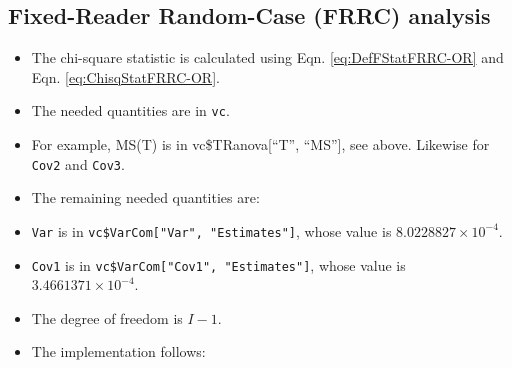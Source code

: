 \documentclass[
]{book}
\newenvironment{Shaded}{\begin{snugshade}}{\end{snugshade}}
\newcommand{\CommentTok}[1]{\textcolor[rgb]{0.56,0.35,0.01}{\textit{#1}}}
\newcommand{\DataTypeTok}[1]{\textcolor[rgb]{0.13,0.29,0.53}{#1}}
\newcommand{\DecValTok}[1]{\textcolor[rgb]{0.00,0.00,0.81}{#1}}
\newcommand{\KeywordTok}[1]{\textcolor[rgb]{0.13,0.29,0.53}{\textbf{#1}}}
\newcommand{\NormalTok}[1]{#1}
\newcommand{\OperatorTok}[1]{\textcolor[rgb]{0.81,0.36,0.00}{\textbf{#1}}}
\newcommand{\OtherTok}[1]{\textcolor[rgb]{0.56,0.35,0.01}{#1}}
\newcommand{\StringTok}[1]{\textcolor[rgb]{0.31,0.60,0.02}{#1}}
\providecommand{\tightlist}{%
  \setlength{\itemsep}{0pt}\setlength{\parskip}{0pt}}
\begin{document}
\begin{Shaded}
\end{Shaded}

\hypertarget{or-applications-FRRC-dataset02-hand}{%
\subsection{Fixed-Reader Random-Case (FRRC) analysis}\label{or-applications-FRRC-dataset02-hand}}

\begin{itemize}
\tightlist
\item
  The chi-square statistic is calculated using Eqn. \eqref{eq:DefFStatFRRC-OR} and Eqn. \eqref{eq:ChisqStatFRRC-OR}.
\item
  The needed quantities are in \texttt{vc}.
\item
  For example, MS(T) is in vc\$TRanova{[}``T'', ``MS''{]}, see above. Likewise for \texttt{Cov2} and \texttt{Cov3}.
\item
  The remaining needed quantities are:
\item
  \texttt{Var} is in \texttt{vc\$VarCom{[}"Var",\ "Estimates"{]}}, whose value is \ensuremath{8.0228827\times 10^{-4}}.
\item
  \texttt{Cov1} is in \texttt{vc\$VarCom{[}"Cov1",\ "Estimates"{]}}, whose value is \ensuremath{3.4661371\times 10^{-4}}.
\item
  The degree of freedom is \(I-1\).
\item
  The implementation follows:
\end{itemize}
\end{document}
